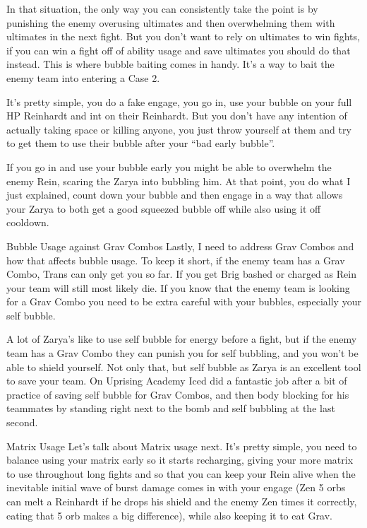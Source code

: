 In that situation, the only way you can consistently take the point is by punishing the enemy overusing ultimates and then overwhelming them with ultimates in the next fight. But you don’t want to rely on ultimates to win fights, if you can win a fight off of ability usage and save ultimates you should do that instead. This is where bubble baiting comes in handy. It’s a way to bait the enemy team into entering a Case 2.

It’s pretty simple, you do a fake engage, you go in, use your bubble on your full HP Reinhardt and int on their Reinhardt. But you don’t have any intention of actually taking space or killing anyone, you just throw yourself at them and try to get them to use their bubble after your “bad early bubble”.

If you go in and use your bubble early you might be able to overwhelm the enemy Rein, scaring the Zarya into bubbling him. At that point, you do what I just explained, count down your bubble and then engage in a way that allows your Zarya to both get a good squeezed bubble off while also using it off cooldown. 

Bubble Usage against Grav Combos
Lastly, I need to address Grav Combos and how that affects bubble usage. To keep it short, if the enemy team has a Grav Combo, Trans can only get you so far. If you get Brig bashed or charged as Rein your team will still most likely die. If you know that the enemy team is looking for a Grav Combo you need to be extra careful with your bubbles, especially your self bubble.

A lot of Zarya's like to use self bubble for energy before a fight, but if the enemy team has a Grav Combo they can punish you for self bubbling, and you won’t be able to shield yourself. Not only that, but self bubble as Zarya is an excellent tool to save your team. On Uprising Academy Iced did a fantastic job after a bit of practice of saving self bubble for Grav Combos, and then body blocking for his teammates by standing right next to the bomb and self bubbling at the last second. 

Matrix Usage
Let’s talk about Matrix usage next. It’s pretty simple, you need to balance using your matrix early so it starts recharging, giving your more matrix to use throughout long fights and so that you can keep your Rein alive when the inevitable initial wave of burst damage comes in with your engage (Zen 5 orbs can melt a Reinhardt if he drops his shield and the enemy Zen times it correctly, eating that 5 orb makes a big difference), while also keeping it to eat Grav.

